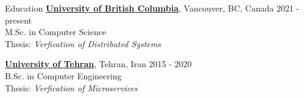 \documentclass{resume} %
\begin{document}
	

\begin{rSection}{Education}
	{\bf \href{https://www.ubc.ca/}{University of British Columbia}}, Vancouver, BC, Canada
        \hfill 2021 - present
	\\M.Sc. in Computer Science
  \\Thesis: \textit{Verfication of Distributed Systems}
	
	{\bf \href{http://ut.ac.ir/en}{University of Tehran}}, Tehran, Iran \hfill 2015 - 2020 
	\\B.Sc. in Computer Engineering
  \\Thesis: \textit{Verfication of Microservices}
\end{rSection}

\end{document}

